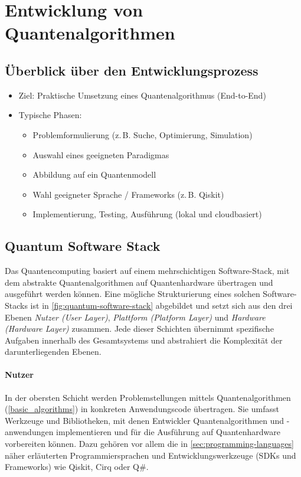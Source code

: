 \section{Entwicklung von Quantenalgorithmen}

\subsection{Überblick über den Entwicklungsprozess}
\begin{itemize}
    \item Ziel: Praktische Umsetzung eines Quantenalgorithmus (End-to-End)
    \item Typische Phasen:
    \begin{itemize}
        \item Problemformulierung (z.\,B. Suche, Optimierung, Simulation)
        \item Auswahl eines geeigneten Paradigmas
        \item Abbildung auf ein Quantenmodell
        \item Wahl geeigneter Sprache / Frameworks (z.\,B. Qiskit)
        \item Implementierung, Testing, Ausführung (lokal und cloudbasiert)
    \end{itemize}
\end{itemize}

\subsection{Quantum Software Stack}

Das Quantencomputing basiert auf einem mehrschichtigen Software-Stack, mit dem abstrakte Quantenalgorithmen auf Quantenhardware übertragen und ausgeführt werden können. Eine mögliche Strukturierung eines solchen Software-Stacks ist in \autoref{fig:quantum-software-stack} abgebildet und setzt sich aus den drei Ebenen \emph{Nutzer (User Layer)}, \emph{Plattform (Platform Layer)} und \emph{Hardware (Hardware Layer)} zusammen. Jede dieser Schichten übernimmt spezifische Aufgaben innerhalb des Gesamtsystems und abstrahiert die Komplexität der darunterliegenden Ebenen.
\\
\paragraph{Nutzer}  
In der obersten Schicht werden Problemstellungen mittels Quantenalgorithmen (\autoref{basic_algorithms}) in konkreten Anwendungscode übertragen. Sie umfasst Werkzeuge und Bibliotheken, mit denen Entwickler Quantenalgorithmen und -anwendungen implementieren und für die Ausführung auf Quantenhardware vorbereiten können. Dazu gehören vor allem die in \autoref{sec:programming-languages} näher erläuterten Programmiersprachen und Entwicklungswerkzeuge (SDKs und Frameworks) wie Qiskit, Cirq oder Q\#.
\\
